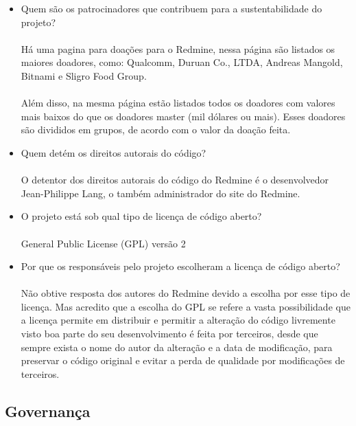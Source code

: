 \documentclass[12pt,a4paper]{article} %
\begin{document}
\begin{itemize}
\item Quem s\~ao os patrocinadores que contribuem para a sustentabilidade do projeto?\\
\\ Há uma pagina para doações para o Redmine, nessa p\'agina s\~ao listados os maiores doadores, como: Qualcomm, Duruan Co., LTDA, Andreas Mangold, Bitnami e Sligro Food Group.\\
\\
Além disso, na mesma página estão listados todos os doadores com valores mais baixos do que os doadores master (mil dólares ou mais). Esses doadores são divididos em grupos, de acordo com o valor da doação feita.


\item Quem det\'em os direitos autorais do c\'odigo?\\
\\ O detentor dos direitos autorais do código do Redmine é o desenvolvedor Jean-Philippe Lang, o também administrador do site do Redmine.

\item O projeto está sob qual tipo de licença de c\'odigo aberto?\\
\\
General Public License (GPL) versão 2
\item Por que os respons\'aveis pelo projeto escolheram a licença de c\'odigo aberto?\\
\\ Não obtive resposta dos autores do Redmine devido a escolha por esse tipo de licença. Mas acredito que a escolha do GPL se refere a vasta possibilidade que a licença permite em distribuir e permitir a alteração do código livremente visto boa parte do seu desenvolvimento é feita por terceiros, desde que sempre exista o nome do autor da alteração e a data de modificação, para preservar o código original e evitar a perda de qualidade por modificações de terceiros.
\end{itemize}

\subsection{Governança}
\end{document}
